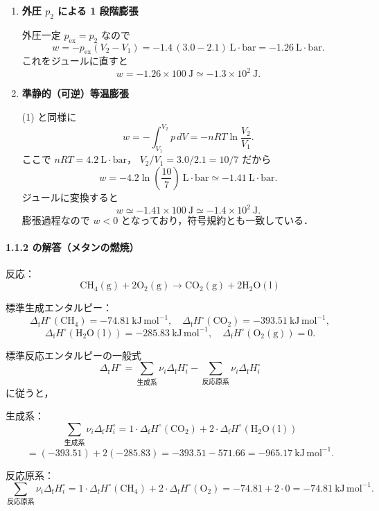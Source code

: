 \documentclass[a4paper,12pt]{jlreq}
\begin{document}
\begin{enumerate}
  \item[(i)] \textbf{外圧 $p_2$ による 1 段階膨張}

  外圧一定 $p_{\mathrm{ex}} = p_2$ なので
  \[
    w = -p_{\mathrm{ex}}(V_2-V_1)
      = -1.4\,(3.0-2.1)\ \mathrm{L\cdot bar}
      = -1.26\ \mathrm{L\cdot bar}.
  \]
  これをジュールに直すと
  \[
    w = -1.26\times 100\ \mathrm{J}
      \simeq -1.3\times10^{2}\ \mathrm{J}.
  \]

  \item[(ii)] \textbf{準静的（可逆）等温膨張}

  (1) と同様に
  \[
    w = -\int_{V_1}^{V_2} p\,dV
      = -nRT\ln\frac{V_2}{V_1}.
  \]
  ここで $nRT = 4.2\ \mathrm{L\cdot bar}$，
  \(
    V_2/V_1 = 3.0/2.1 = 10/7
  \)
  だから
  \[
    w = -4.2\ln\!\left(\frac{10}{7}\right)\ \mathrm{L\cdot bar}
      \simeq -1.41\ \mathrm{L\cdot bar}.
  \]
  ジュールに変換すると
  \[
    w \simeq -1.41\times100\ \mathrm{J}
      \simeq -1.4\times10^{2}\ \mathrm{J}.
  \]
  膨張過程なので $w<0$ となっており，符号規約とも一致している．
\end{enumerate}






\newpage


\paragraph{1.1.2 の解答（メタンの燃焼）}

反応：
\[
\mathrm{CH_4(g) + 2O_2(g) \rightarrow CO_2(g) + 2H_2O(l)}
\]

標準生成エンタルピー：
\[
\Delta_{\mathrm f}H^\circ(\mathrm{CH_4}) = -74.81\ \mathrm{kJ\,mol^{-1}},
\quad
\Delta_{\mathrm f}H^\circ(\mathrm{CO_2}) = -393.51\ \mathrm{kJ\,mol^{-1}},
\]
\[
\Delta_{\mathrm f}H^\circ(\mathrm{H_2O(l)}) = -285.83\ \mathrm{kJ\,mol^{-1}},
\quad
\Delta_{\mathrm f}H^\circ(\mathrm{O_2(g)}) = 0.
\]

標準反応エンタルピーの一般式
\[
\Delta_{\mathrm r}H^\circ
 = \sum_{\text{生成系}} \nu_i \Delta_{\mathrm f}H_i^\circ
 - \sum_{\text{反応原系}} \nu_i \Delta_{\mathrm f}H_i^\circ
\]
に従うと，

生成系：
\[
\sum_{\text{生成系}} \nu_i \Delta_{\mathrm f}H_i^\circ
= 1\cdot\Delta_{\mathrm f}H^\circ(\mathrm{CO_2})
  + 2\cdot\Delta_{\mathrm f}H^\circ(\mathrm{H_2O(l)})
\]
\[
= (-393.51) + 2(-285.83)
= -393.51 - 571.66
= -965.17\ \mathrm{kJ\,mol^{-1}}.
\]

反応原系：
\[
\sum_{\text{反応原系}} \nu_i \Delta_{\mathrm f}H_i^\circ
= 1\cdot\Delta_{\mathrm f}H^\circ(\mathrm{CH_4})
  + 2\cdot\Delta_{\mathrm f}H^\circ(\mathrm{O_2})
= -74.81 + 2\cdot 0
= -74.81\ \mathrm{kJ\,mol^{-1}}.
\]
\end{document}
